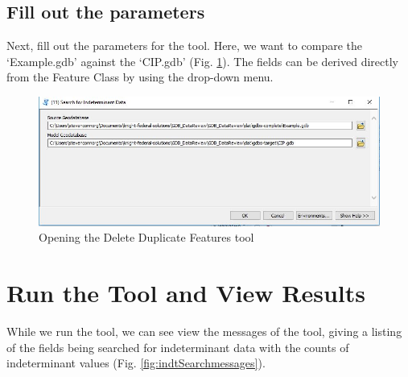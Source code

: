 \documentclass[openany]{book}
\theoremstyle{definition}
\theoremstyle{definition}
\theoremstyle{definition}
\theoremstyle{remark}
\begin{document}
\subsection{Fill out the parameters}\label{fill-out-the-parameters-8}

Next, fill out the parameters for the tool. Here, we want to compare the
`Example.gdb' against the `CIP.gdb' (Fig. \ref{fig:indtSearchparams}).
The fields can be derived directly from the Feature Class by using the
drop-down menu.

\begin{figure}[H]

{\centering \includegraphics{figures/indtSearch-params} 

}

\caption{Opening the Delete Duplicate Features tool}\label{fig:indtSearchparams}
\end{figure}

\section{Run the Tool and View
Results}\label{run-the-tool-and-view-results-8}

While we run the tool, we can see view the messages of the tool, giving
a listing of the fields being searched for indeterminant data with the
counts of indeterminant values (Fig. \ref{fig:indtSearchmessages}).
\end{document}
